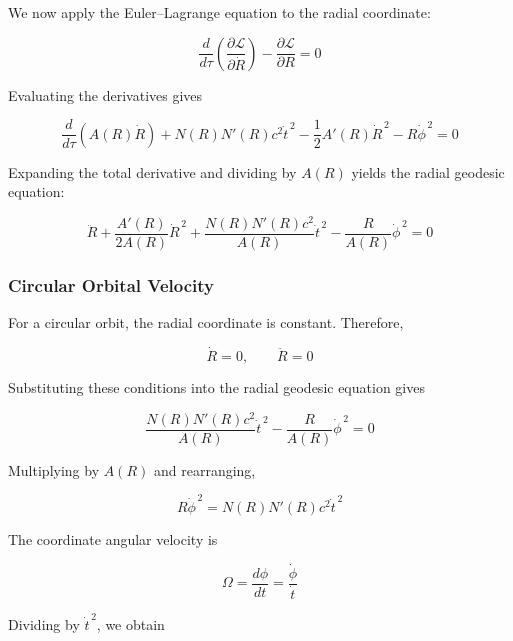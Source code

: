 \documentclass[pdflatex,sn-mathphys-num]{sn-jnl}%
\theoremstyle{thmstyleone}%
\theoremstyle{thmstyletwo}%
\theoremstyle{thmstylethree}%
\begin{document}
\begin{appendices}
We now apply the Euler--Lagrange equation to the radial coordinate:

\begin{equation}
\frac{d}{d\tau}
\left(
\frac{\partial\mathcal{L}}{\partial\dot{R}}
\right)
-
\frac{\partial\mathcal{L}}{\partial R}
=0
\end{equation}

Evaluating the derivatives gives

\begin{equation}
\frac{d}{d\tau}\left(A(R)\dot{R}\right)
+
N(R)N'(R)c^2\dot{t}^{\,2}
-
\frac{1}{2}A'(R)\dot{R}^{\,2}
-
R\dot{\phi}^{\,2}
=0
\end{equation}

Expanding the total derivative and dividing by $A(R)$ yields the radial geodesic equation:

\begin{equation}
\ddot{R}
+
\frac{A'(R)}{2A(R)}\dot{R}^{\,2}
+
\frac{N(R)N'(R)c^2}{A(R)}\dot{t}^{\,2}
-
\frac{R}{A(R)}\dot{\phi}^{\,2}
=0
\end{equation}

\subsubsection{Circular Orbital Velocity}

For a circular orbit, the radial coordinate is constant. Therefore,

\begin{equation}
\dot{R}=0,
\qquad
\ddot{R}=0
\end{equation}

Substituting these conditions into the radial geodesic equation gives

\begin{equation}
\frac{N(R)N'(R)c^2}{A(R)}\dot{t}^{\,2}
-
\frac{R}{A(R)}\dot{\phi}^{\,2}
=0
\end{equation}

Multiplying by $A(R)$ and rearranging,

\begin{equation}
R\dot{\phi}^{\,2}
=
N(R)N'(R)c^2\dot{t}^{\,2}
\end{equation}

The coordinate angular velocity is

\begin{equation}
\Omega
=
\frac{d\phi}{dt}
=
\frac{\dot{\phi}}{\dot{t}}
\end{equation}

Dividing by $\dot{t}^{\,2}$, we obtain


\end{appendices}
\end{document}
